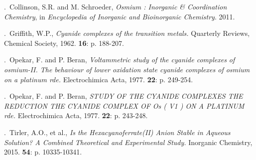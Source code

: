 \documentclass{article}
\begin{document}
.\ Collinson, S.R. and M. Schroeder, \emph{Osmium : Inorganic \& Coordination Chemistry}, in \emph{Encyclopedia of Inorganic and Bioinorganic Chemistry}. 2011.\par
{}.\ Griffith, W.P., \emph{Cyanide complexes of the transition metals.} Quarterly Reviews, Chemical Society, 1962. \textbf{16}: p. 188-207.\par
{}.\ Opekar, F. and P. Beran, \emph{Voltammetric study of the cyanide complexes of osmium-II.  The behaviour of lower oxidation state cyanide complexes of osmium on a platinum rde.} Electrochimica Acta, 1977. \textbf{22}: p. 249-254.\par
{}.\ Opekar, F. and P. Beran, \emph{STUDY OF THE CYANIDE COMPLEXES THE REDUCTION  THE CYANIDE COMPLEX OF Os ( V1 ) ON A PLATINUM rde.} Electrochimica Acta, 1977. \textbf{22}: p. 243-248.\par
{}.\ Tirler, A.O., et al., \emph{Is the Hexacyanoferrate(II) Anion Stable in Aqueous Solution? A  Combined Theoretical and Experimental Study.} Inorganic Chemistry, 2015. \textbf{54}: p. 10335-10341.\par
\end{document}
